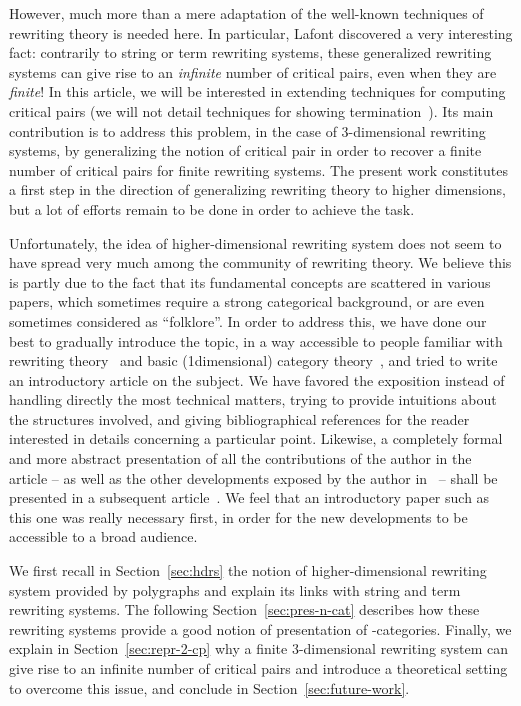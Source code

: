 \documentclass{LMCS}
\begin{document}
However, much more than a mere adaptation of the well-known techniques of
rewriting theory is needed here. In particular, Lafont discovered a very
interesting fact: contrarily to string or term rewriting systems, these
generalized rewriting systems can give rise to an \emph{infinite} number of
critical pairs, even when they are \emph{finite}!
In this article, we will be interested in extending techniques for computing
critical pairs (we will not detail techniques for showing
termination~\cite{guiraud:termination-3-rewr}). Its main contribution is to
address this problem, in the case of 3-dimensional rewriting systems, by
generalizing the notion of critical pair in order to recover a finite number of
critical pairs for finite rewriting systems.
The present work constitutes a first step in the direction of generalizing
rewriting theory to higher dimensions, but a lot of efforts remain to be done in
order to achieve the task.

\bigskip

Unfortunately, the idea of higher-dimensional rewriting system does not seem to
have spread very much among the community of rewriting theory. We believe this
is partly due to the fact that its fundamental concepts are scattered in various
papers, which sometimes require a strong categorical background, or are even
sometimes considered as ``folklore''. In order to address this, we have done our
best to gradually introduce the topic, in a way accessible to people familiar
with rewriting theory~\cite{baader-nipkow:trat, terese:trs} and basic
(1\nbd{}dimensional) category theory~\cite{maclane:cwm}, and tried to write an
introductory article on the subject. We have favored the exposition instead of
handling directly the most technical matters, trying to provide intuitions about
the structures involved, and giving bibliographical references for the reader
interested in details concerning a particular point. Likewise, a completely
formal and more abstract presentation of all the contributions of the author in
the article -- as well as the other developments exposed by the author
in~\cite{mimram:critical-pairs} -- shall be presented in a subsequent
article~\cite{mimram:2-cp}. We feel that an introductory paper such as this one
was really necessary first, in order for the new developments to be accessible
to a broad audience.

\bigskip

We first recall in Section~\ref{sec:hdrs} the notion of higher-dimensional
rewriting system provided by polygraphs and explain its links with string and
term rewriting systems. The following Section~\ref{sec:pres-n-cat} describes how
these rewriting systems provide a good notion of presentation of
-categories. Finally, we explain in Section~\ref{sec:repr-2-cp} why a finite
3-dimensional rewriting system can give rise to an infinite number of critical
pairs and introduce a theoretical setting to overcome this issue, and conclude
in Section~\ref{sec:future-work}.
\end{document}
